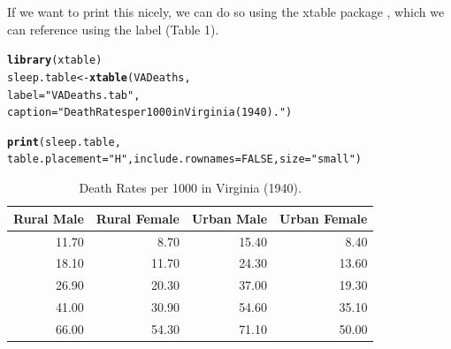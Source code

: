 \documentclass{article}\usepackage[]{graphicx}\usepackage[]{xcolor}
\makeatletter
\newcommand{\hlnum}[1]{\textcolor[rgb]{0.686,0.059,0.569}{#1}}%
\newcommand{\hlsng}[1]{\textcolor[rgb]{0.192,0.494,0.8}{#1}}%
\newcommand{\hldef}[1]{\textcolor[rgb]{0.345,0.345,0.345}{#1}}%
\newcommand{\hlkwb}[1]{\textcolor[rgb]{0.69,0.353,0.396}{#1}}%
\newcommand{\hlkwc}[1]{\textcolor[rgb]{0.333,0.667,0.333}{#1}}%
\newcommand{\hlkwd}[1]{\textcolor[rgb]{0.737,0.353,0.396}{\textbf{#1}}}%
\newenvironment{kframe}{%
 \def\at@end@of@kframe{}%
 \ifinner\ifhmode%
  \def\at@end@of@kframe{\end{minipage}}%
  \begin{minipage}{\columnwidth}%
 \fi\fi%
 \def\FrameCommand##1{\hskip\@totalleftmargin \hskip-\fboxsep
 \colorbox{shadecolor}{##1}\hskip-\fboxsep
     \hskip-\linewidth \hskip-\@totalleftmargin \hskip\columnwidth}%
 \MakeFramed {\advance\hsize-\width
   \@totalleftmargin\z@ \linewidth\hsize
   \@setminipage}}%
 {\par\unskip\endMakeFramed%
 \at@end@of@kframe}
\newenvironment{knitrout}{}{} %
\makeatother
\begin{document}
\begin{multicols}{2}
 If we want to print this nicely, we can do so using the
 xtable package \citep{xtable}, which we can reference
 using the label (Table 1).
 
\begin{knitrout}
\color{fgcolor}\begin{kframe}
\begin{alltt}
\hlkwd{library}\hldef{(xtable)}
\hldef{sleep.table}\hlkwb{<-}\hlkwd{xtable}\hldef{(VADeaths,}
    \hlkwc{label}\hldef{=}\hlsng{"VADeaths.tab"}\hldef{,}
    \hlkwc{caption}\hldef{=}\hlsng{"Death Rates per 1000 in Virginia (1940)."}\hldef{)}
\end{alltt}
\end{kframe}
\end{knitrout}
 
\begin{kframe}
\begin{alltt}
\hlkwd{print}\hldef{(sleep.table,}
\hlkwc{table.placement} \hldef{=} \hlsng{"H"}\hldef{,} \hlkwc{include.rownames}\hldef{=}\hlnum{FALSE}\hldef{,} \hlkwc{size} \hldef{=} \hlsng{"small"}\hldef{)}
\end{alltt}
\end{kframe}%
\begin{table}[H]
\centering
\begingroup\small
\begin{tabular}{rrrr}
  \hline
Rural Male & Rural Female & Urban Male & Urban Female \\ 
  \hline
11.70 & 8.70 & 15.40 & 8.40 \\ 
  18.10 & 11.70 & 24.30 & 13.60 \\ 
  26.90 & 20.30 & 37.00 & 19.30 \\ 
  41.00 & 30.90 & 54.60 & 35.10 \\ 
  66.00 & 54.30 & 71.10 & 50.00 \\ 
   \hline
\end{tabular}
\endgroup
\caption{Death Rates per 1000 in Virginia (1940).} 
\label{VADeaths.tab}
\end{table}


\begin{tiny}

\end{tiny}

\end{multicols}
\end{document}
